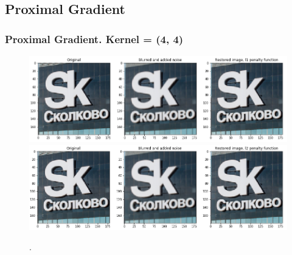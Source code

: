 \documentclass[hyperref={pdfpagelabels=false}]{beamer}
\begin{document}
\subsection{Proximal Gradient}
\begin{frame}
\frametitle{Proximal Gradient. Kernel = (4, 4)}
\begin{center}
\begin{figure}[h]
\begin{adjustwidth}{-0.2cm}{-0.5 cm}
\includegraphics[scale=0.355]{l1_all_imgs_4_4.png} \\
\includegraphics[scale=0.355]{l2_all_imgs_4_4.png} \\
\end{adjustwidth}
\caption{.}
\end{figure}
\end{center}

\end{frame}
\end{document}
